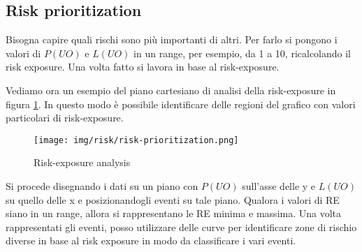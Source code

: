 \subsection{Risk prioritization}
Bisogna capire quali rischi sono più importanti di altri. Per farlo si pongono i
valori di $P(UO)$ e $L(UO)$ in un range, per esempio, da 1 a 10, ricalcolando il
risk exposure. Una volta fatto si lavora in base al risk-exposure.

\begin{esempio}
    Vediamo ora un esempio del piano cartesiano di analisi della risk-exposure in
    figura \ref{fig:risk-exposure-analysis}. In questo modo è possibile identificare
    delle regioni del grafico con valori particolari di risk-exposure.
    \begin{figure}[!ht]
        \centering
        \texttt{[image: img/risk/risk-prioritization.png]}
        \caption{Risk-exposure analysis}
        \label{fig:risk-exposure-analysis}
    \end{figure}
\end{esempio}

Si procede disegnando i dati su un piano con $P(UO)$ sull'asse delle y e $L(UO)$
su quello  delle x e posizionandogli eventi su tale piano. Qualora i valori di RE siano
in un range, allora si rappresentano le RE minima e massima. 
Una volta rappresentati gli eventi, posso utilizzare delle curve per
identificare zone di rischio diverse in base al risk exposure in modo da
classificare i vari eventi.

